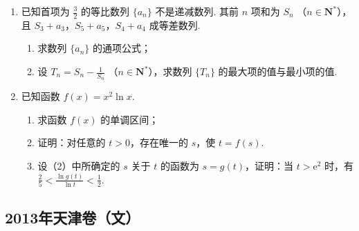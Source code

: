 \begin{description}
\begin{enumerate}[leftmargin=5pt]
        \item 已知首项为 \(\frac{3}{2}\) 的等比数列 \(\{a_{n}\}\) 不是递减数列. 其前 \(n\) 项和为 \(S_{n}\) （\(n \in \mathbf{N}^{*}\)），且 \(S_{3} + a_{3}\)，\(S_{5} + a_{5}\)，\(S_{4} + a_{4}\) 成等差数列.
\begin{enumerate}
\item 求数列 \( \{a_{n}\} \) 的通项公式；
\item 设 \(T_{n} = S_{n} - \frac{1}{S_{n}}\) （\(n \in \mathbf{N}^{*}\)），求数列 \(\{T_{n}\}\) 的最大项的值与最小项的值.
\end{enumerate}

        \item 已知函数 \( f(x) = x^2 \ln x \).
\begin{enumerate}
\item 求函数 \( f(x) \) 的单调区间；
\item 证明：对任意的 \(t > 0\)，存在唯一的 \(s\)，使 \(t = f(s)\).
\item 设（2）中所确定的 \(s\) 关于 \(t\) 的函数为 \(s = g(t)\)，证明：当 \(t > {\mathrm{e}}^2\) 时，有 \( \frac {2}{5} < \frac {\ln g(t)}{\ln t} < \frac {1}{2} \).
\end{enumerate}

    \end{enumerate}

\end{description}


\subsection{2013年天津卷（文）}\label{gk:2013年天津卷（文）}

